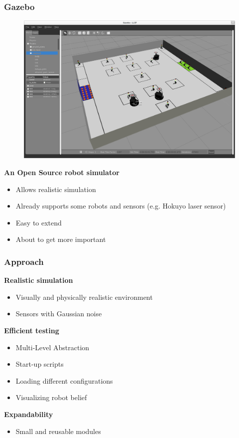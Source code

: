 \documentclass[]{beamer}
\begin{document}
\begin{frame}
  \frametitle{Gazebo}
  \begin{multicols}{2}
    \begin{figure}
      \includegraphics[scale=0.11]{../pics/gazebo_window.png}
    \end{figure}
    \textbf{\large An Open Source robot simulator}
    \begin{itemize}
    \item Allows realistic simulation %
    \item Already supports some robots and sensors (e.g. Hokuyo laser sensor)
    \item Easy to extend
    \item About to get more important
    \end{itemize}
  \end{multicols}
\end{frame}

\begin{frame}
  \frametitle{Approach}
  \large{\textbf{Realistic simulation}}
  \begin{itemize} 
  \item Visually and physically realistic environment
  \item Sensors with Gaussian noise 
  \end{itemize} 
  \pause
  \large{\textbf{Efficient testing}}
  \begin{itemize} 
  \item Multi-Level Abstraction 
  \item Start-up scripts 
  \item Loading different configurations 
  \item Visualizing robot belief 
  \end{itemize} 
  \pause
  \large{\textbf{Expandability}}
  \begin{itemize} 
  \item Small and reusable modules 
  \end{itemize}
\end{frame}
\end{document}
